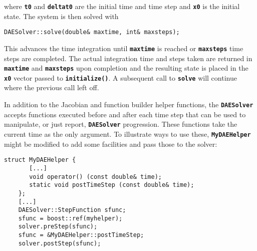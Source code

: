 where \textbf{\texttt{t0}} and \textbf{\texttt{deltat0}} are the
initial time and time step and \textbf{\texttt{x0}} is the initial
state.  The system is then solved with

{
\color{red}
\begin{Verbatim}[fontseries=b]
    DAESolver::solve(double& maxtime, int& maxsteps);
\end{Verbatim}
}

This advances the time integration until \textbf{\texttt{maxtime}} is
reached or \textbf{\texttt{maxsteps}} time steps are completed.  The
actual integration time and steps taken are returned in
\textbf{\texttt{maxtime}} and \textbf{\texttt{maxsteps}} upon
completion and the resulting state is placed in the
\texttt{\textbf{x0}} vector passed to
\texttt{\textbf{initialize()}}. A subsequent call to
\textbf{\texttt{solve}} will continue where the previous call left
off.

In addition to the Jacobian and function builder helper functions, the
\texttt{\textbf{DAESolver}} accepts functions executed before and
after each time step that can be used to manipulate, or just report,
\texttt{\textbf{DAESolver}} progression.  These functions take the
current time as the only argument.  To illustrate ways to use these,
\textbf{\texttt{MyDAEHelper}} might be modified to add some facilities
and pass those to the solver:

{
\color{red}
\begin{Verbatim}[fontseries=b]
    struct MyDAEHelper {
       [...]
       void operator() (const double& time); 
       static void postTimeStep (const double& time);
    };
    [...] 
    DAESolver::StepFunction sfunc;
    sfunc = boost::ref(myhelper);
    solver.preStep(sfunc);
    sfunc = &MyDAEHelper::postTimeStep;
    solver.postStep(sfunc);
\end{Verbatim}
}

